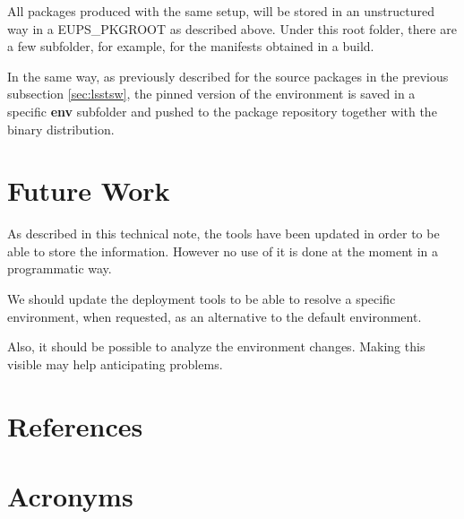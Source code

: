 \documentclass[DM,authoryear,toc]{lsstdoc}
\begin{document}
All packages produced with the same setup, will be stored in an unstructured way in a EUPS\_PKGROOT as described above.
Under this root folder, there are a few subfolder, for example, for the manifests obtained in a build.

In the same way, as previously described for the source packages in the previous subsection \ref{sec:lsstsw},
the pinned version of the environment is saved in a specific \textbf{env} subfolder and pushed to the package repository 
together with the binary distribution.



\section{Future Work} \label{sec:future}

As described in this technical note, the tools have been updated in order to be able to store the information.
However no use of it is done at the moment in a programmatic way.

We should update the deployment tools to be able to resolve a specific environment, when requested, 
as an alternative to the default environment.

Also, it should be possible to analyze the environment changes. Making this visible may help anticipating problems.



\appendix
\section{References} \label{sec:bib}
\renewcommand{\refname}{} %


\section{Acronyms} \label{sec:acronyms}

\end{document}
